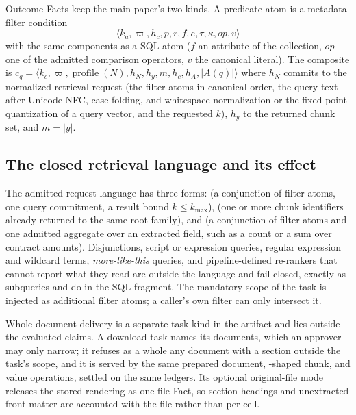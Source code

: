 \documentclass[journal,onecolumn]{IEEEtran}
\newcommand{\code}[1]{\texttt{\detokenize{#1}}}
\begin{document}
Outcome Facts keep the main paper's two kinds. A predicate atom is a
metadata filter condition
\[
 \langle k_a,\varpi,h_c,p,r,f,e,\tau,\kappa,op,v\rangle
\]
with the same components as a SQL atom ($f$ an attribute of the collection, $op$ one of
the admitted comparison operators, $v$ the canonical literal). The composite
is $c_q=\langle k_c,\varpi,\operatorname{profile}(N),h_N,h_y,m,h_c,h_A,|A(q)|\rangle$
where $h_N$ commits to the normalized retrieval request (the filter atoms in
canonical order, the query text after Unicode NFC, case folding, and
whitespace normalization or the fixed-point quantization of a query vector,
and the requested $k$), $h_y$ to the returned chunk set, and $m=|y|$.

\subsection{The closed retrieval language and its effect}

The admitted request language has three forms: \code{search} (a conjunction
of filter atoms, one query commitment, a result bound $k\le k_{\max}$),
\code{fetch} (one or more chunk identifiers already returned to the same
root family), and \code{aggregate} (a conjunction of filter atoms and one
admitted aggregate over an extracted field, such as a count or a sum over
contract amounts). Disjunctions, script or expression queries, regular
expression and wildcard terms, \emph{more-like-this} queries, and
pipeline-defined re-rankers that cannot report what they read are outside
the language and fail closed, exactly as subqueries and \code{OR} do in the
SQL fragment. The mandatory scope of the task is injected as additional
filter atoms; a caller's own filter can only intersect it.

Whole-document delivery is a separate task kind in the artifact and lies
outside the evaluated claims. A download task names its documents, which an
approver may only narrow; it refuses as a whole any document with a section
outside the task's scope, and it is served by the same prepared document,
\code{fetch}-shaped chunk, and value operations, settled on the same ledgers.
Its optional original-file mode releases the stored rendering as one file
Fact, so section headings and unextracted front matter are accounted with the
file rather than per cell.
\end{document}
